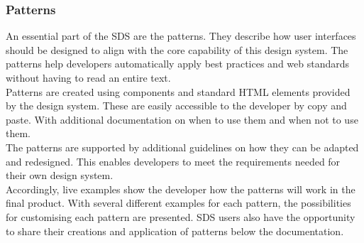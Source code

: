 \subsubsection*{Patterns}
An essential part of the \ac{SDS} are the patterns. They describe how user interfaces should be designed to align with the core capability of this design system. The patterns help developers automatically apply best practices and web standards without having to read an entire text. \\
Patterns are created using components and standard HTML elements provided by the design system. These are easily accessible to the developer by copy and paste. With additional documentation on when to use them and when not to use them. \\
The patterns are supported by additional guidelines on how they can be adapted and redesigned. This enables developers to meet the requirements needed for their own design system.\\
Accordingly, live examples show the developer how the patterns will work in the final product. With several different examples for each pattern, the possibilities for customising each pattern are presented. \ac{SDS} users also have the opportunity to share their creations and application of patterns below the documentation. 
